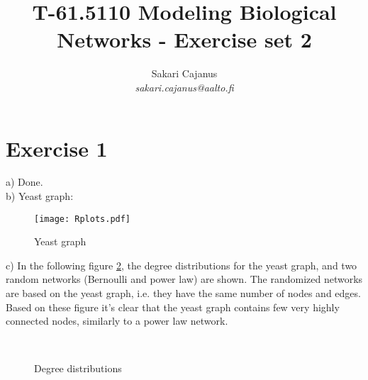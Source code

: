 \documentclass[a4paper]{article}
\title{T-61.5110 Modeling Biological Networks - Exercise set 2}
\author{Sakari Cajanus \\
       {\it sakari.cajanus@aalto.fi}}
\begin{document}
\maketitle


\newpage

\section*{Exercise 1}
a) Done.\\
b) Yeast graph:\\
\begin{figure}[ht!]
  \begin{center}
      \texttt{[image: Rplots.pdf]}
    \caption{Yeast graph}\label{fig:post}
 \end{center}
\end{figure}

c) In the following figure \ref{fig_example}, the degree distributions for the yeast graph, and two random networks (Bernoulli and power law) are shown. The randomized networks are based on the yeast graph, i.e. they have the same number of nodes and edges. Based on these figure it's clear that the yeast graph contains few very highly connected nodes, similarly to a power law network.
\begin{figure}
  \begin{center}
    ~
    ~
    \caption{Degree distributions}\label{fig_example}
 \end{center}
\end{figure}
\end{document}
